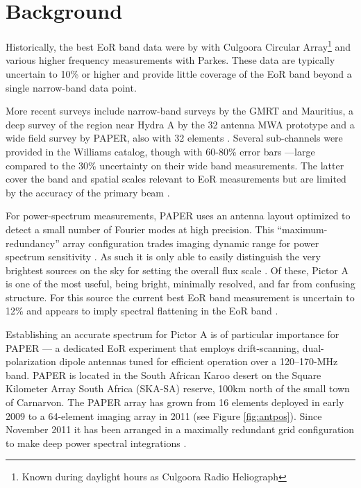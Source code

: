 \documentclass[preprint]{aastex}
\begin{document}
\section{Background}


Historically, the best
EoR band data were by \citet{Slee:1995p7541} with Culgoora Circular
Array\footnote{Known during daylight hours as Culgoora Radio Heliograph} and
various higher frequency measurements with Parkes.  These data are typically
uncertain to 10\% or higher and provide little coverage of the EoR band beyond
a single narrow-band data point. 

More recent surveys include narrow-band surveys by the GMRT and Mauritius, a
deep survey of the region near Hydra A by the 32 antenna MWA prototype
\cite{Williams:2012p8768} and a wide field survey by PAPER, also with 32
elements \cite{Jacobs:2011p8438}. Several sub-channels were provided in the
Williams catalog, though with 60-80\% error bars ---large compared to the 30\%
uncertainty on their wide band measurements.  The latter cover the band and
spatial scales relevant to EoR measurements but are limited by the accuracy of
the primary beam \citep{Jacobs:2013p9713}.


For power-spectrum measurements, PAPER uses an antenna layout
optimized to detect a small number of Fourier modes at high precision.  This ``maximum-redundancy''
array configuration trades imaging dynamic range for power spectrum sensitivity \citep{Parsons2012a}.
As such it is only able to easily distinguish the very brightest sources on the
sky for setting the overall flux scale \citep{Parsons2013b}. 
Of these, Pictor A is
one of the most useful, being bright, minimally resolved, and far from
confusing structure. 
For this source the current best EoR band measurement
is uncertain to 12\% and appears to imply spectral flattening in the EoR band
\citep{Perley:1997p9312}.

Establishing an accurate spectrum for Pictor A is of particular importance for
PAPER --- a dedicated EoR experiment 
that employs drift-scanning, dual-polarization dipole antennas 
tuned for efficient operation over a 120--170-MHz band.  PAPER is located in the South African Karoo desert
on the Square Kilometer Array
South Africa (SKA-SA) reserve, 100km north of the small town of Carnarvon.
The PAPER array has grown from 16 elements deployed in early 2009 to a
64-element imaging array in 2011 (see Figure \ref{fig:antpos}). 
Since November 2011 it has been arranged in a maximally redundant grid 
configuration to make deep power spectral integrations \citep{Parsons:2012a}.
\end{document}
